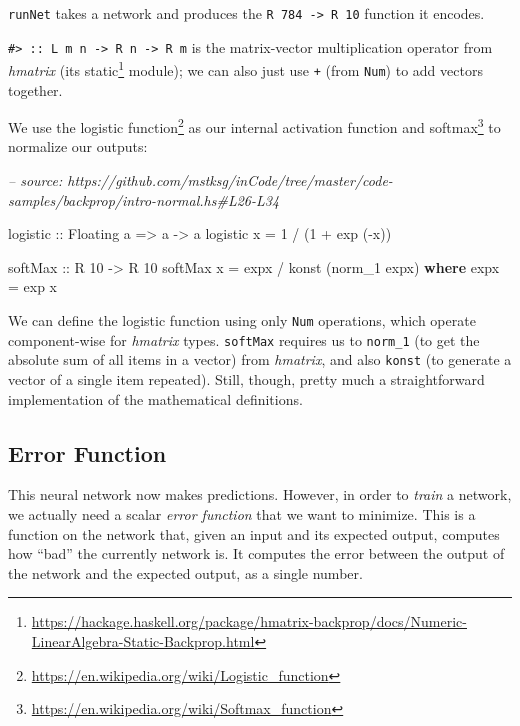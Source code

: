 \documentclass[]{article}
\newenvironment{Shaded}{}{}
\newcommand{\CommentTok}[1]{\textcolor[rgb]{0.38,0.63,0.69}{\textit{#1}}}
\newcommand{\DataTypeTok}[1]{\textcolor[rgb]{0.56,0.13,0.00}{#1}}
\newcommand{\DecValTok}[1]{\textcolor[rgb]{0.25,0.63,0.44}{#1}}
\newcommand{\FunctionTok}[1]{\textcolor[rgb]{0.02,0.16,0.49}{#1}}
\newcommand{\KeywordTok}[1]{\textcolor[rgb]{0.00,0.44,0.13}{\textbf{#1}}}
\newcommand{\NormalTok}[1]{#1}
\newcommand{\OtherTok}[1]{\textcolor[rgb]{0.00,0.44,0.13}{#1}}
\renewcommand{\href}[2]{#2\footnote{\url{#1}}}
\begin{document}
\texttt{runNet} takes a network and produces the
\texttt{R\ 784\ -\textgreater{}\ R\ 10} function it encodes.

\texttt{\#\textgreater{}\ ::\ L\ m\ n\ -\textgreater{}\ R\ n\ -\textgreater{}\ R\ m}
is the matrix-vector multiplication operator from \emph{hmatrix} (its
\href{https://hackage.haskell.org/package/hmatrix-backprop/docs/Numeric-LinearAlgebra-Static-Backprop.html}{static}
module); we can also just use \texttt{+} (from \texttt{Num}) to add vectors
together.

We use the \href{https://en.wikipedia.org/wiki/Logistic_function}{logistic
function} as our internal activation function and
\href{https://en.wikipedia.org/wiki/Softmax_function}{softmax} to normalize our
outputs:

\begin{Shaded}
\begin{Highlighting}[]
\CommentTok{-- source: https://github.com/mstksg/inCode/tree/master/code-samples/backprop/intro-normal.hs#L26-L34}

\OtherTok{logistic ::} \DataTypeTok{Floating}\NormalTok{ a }\OtherTok{=>}\NormalTok{ a }\OtherTok{->}\NormalTok{ a}
\NormalTok{logistic x }\FunctionTok{=} \DecValTok{1} \FunctionTok{/}\NormalTok{ (}\DecValTok{1} \FunctionTok{+}\NormalTok{ exp (}\FunctionTok{-}\NormalTok{x))}

\NormalTok{softMax}
\OtherTok{    ::} \DataTypeTok{R} \DecValTok{10}
    \OtherTok{->} \DataTypeTok{R} \DecValTok{10}
\NormalTok{softMax x }\FunctionTok{=}\NormalTok{ expx }\FunctionTok{/}\NormalTok{ konst (norm_1 expx)}
  \KeywordTok{where}
\NormalTok{    expx }\FunctionTok{=}\NormalTok{ exp x}
\end{Highlighting}
\end{Shaded}

We can define the logistic function using only \texttt{Num} operations, which
operate component-wise for \emph{hmatrix} types. \texttt{softMax} requires us to
\texttt{norm\_1} (to get the absolute sum of all items in a vector) from
\emph{hmatrix}, and also \texttt{konst} (to generate a vector of a single item
repeated). Still, though, pretty much a straightforward implementation of the
mathematical definitions.

\hypertarget{error-function}{%
\subsection{Error Function}\label{error-function}}

This neural network now makes predictions. However, in order to \emph{train} a
network, we actually need a scalar \emph{error function} that we want to
minimize. This is a function on the network that, given an input and its
expected output, computes how ``bad'' the currently network is. It computes the
error between the output of the network and the expected output, as a single
number.
\end{document}
